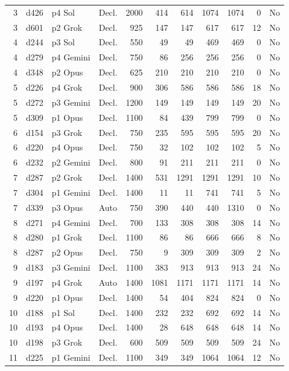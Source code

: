 \begin{longtable}{r l l l r r r r r r l}
3 & d426 & p4 Sol & Decl. & 2000 & 414 & 614 & 1074 & 1074 & 0 & No \\
3 & d601 & p2 Grok & Decl. & 925 & 147 & 147 & 617 & 617 & 12 & No \\
4 & d244 & p3 Sol & Decl. & 550 & 49 & 49 & 469 & 469 & 0 & No \\
4 & d279 & p4 Gemini & Decl. & 750 & 86 & 256 & 256 & 256 & 0 & No \\
4 & d348 & p2 Opus & Decl. & 625 & 210 & 210 & 210 & 210 & 0 & No \\
5 & d226 & p4 Grok & Decl. & 900 & 306 & 586 & 586 & 586 & 18 & No \\
5 & d272 & p3 Gemini & Decl. & 1200 & 149 & 149 & 149 & 149 & 20 & No \\
5 & d309 & p1 Opus & Decl. & 1100 & 84 & 439 & 799 & 799 & 0 & No \\
6 & d154 & p3 Grok & Decl. & 750 & 235 & 595 & 595 & 595 & 20 & No \\
6 & d220 & p4 Opus & Decl. & 750 & 32 & 102 & 102 & 102 & 5 & No \\
6 & d232 & p2 Gemini & Decl. & 800 & 91 & 211 & 211 & 211 & 0 & No \\
7 & d287 & p2 Grok & Decl. & 1400 & 531 & 1291 & 1291 & 1291 & 10 & No \\
7 & d304 & p1 Gemini & Decl. & 1400 & 11 & 11 & 741 & 741 & 5 & No \\
7 & d339 & p3 Opus & Auto & 750 & 390 & 440 & 440 & 1310 & 0 & No \\
8 & d271 & p4 Gemini & Decl. & 700 & 133 & 308 & 308 & 308 & 14 & No \\
8 & d280 & p1 Grok & Decl. & 1100 & 86 & 86 & 666 & 666 & 8 & No \\
8 & d287 & p2 Opus & Decl. & 750 & 9 & 309 & 309 & 309 & 2 & No \\
9 & d183 & p3 Gemini & Decl. & 1100 & 383 & 913 & 913 & 913 & 24 & No \\
9 & d197 & p4 Grok & Auto & 1400 & 1081 & 1171 & 1171 & 1171 & 14 & No \\
9 & d220 & p1 Opus & Decl. & 1400 & 54 & 404 & 824 & 824 & 0 & No \\
10 & d188 & p1 Sol & Decl. & 1400 & 232 & 232 & 692 & 692 & 14 & No \\
10 & d193 & p4 Opus & Decl. & 1400 & 28 & 648 & 648 & 648 & 14 & No \\
10 & d198 & p3 Grok & Decl. & 600 & 509 & 509 & 509 & 509 & 24 & No \\
11 & d225 & p1 Gemini & Decl. & 1100 & 349 & 349 & 1064 & 1064 & 12 & No \\

\end{longtable}
